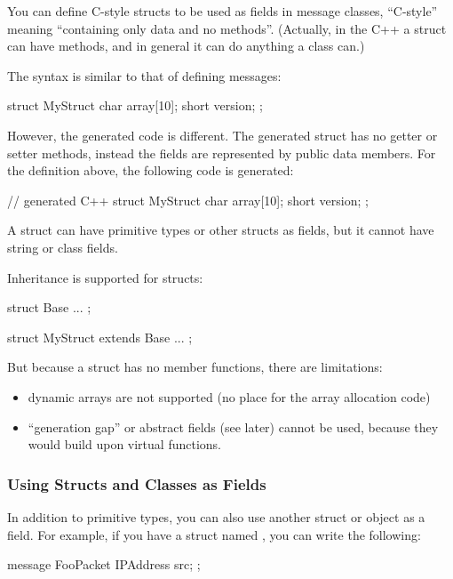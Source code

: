 You can define C-style structs to be used as fields in message classes,
``C-style'' meaning ``containing only data and no methods''.
(Actually, in the C++ a struct can have methods,
and in general it can do anything a class can.)

The syntax is similar to that of defining messages:

\begin{msg}
struct MyStruct
{
    char array[10];
    short version;
};
\end{msg}

However, the generated code is different. The generated struct has
no getter or setter methods, instead the fields are represented
by public data members. For the definition above, the
following code is generated:

\begin{cpp}
// generated C++
struct MyStruct
{
    char array[10];
    short version;
};
\end{cpp}

A struct can have primitive types or other structs as fields, but it cannot
have string or class fields.

Inheritance is supported for structs:

\begin{msg}
struct Base
{
    ...
};

struct MyStruct extends Base
{
    ...
};
\end{msg}

But because a struct has no member functions, there are limitations:

\begin{itemize}
   \item dynamic arrays are not supported (no place for the array allocation code)
   \item ``generation gap'' or abstract fields (see later) cannot be used,
      because they would build upon virtual functions.
\end{itemize}


\subsubsection{Using Structs and Classes as Fields}

In addition to primitive types, you can also use another struct or object
as a field. For example, if you have a struct named ,
you can write the following:

\begin{msg}
message FooPacket
{
    IPAddress src;
};
\end{msg}

